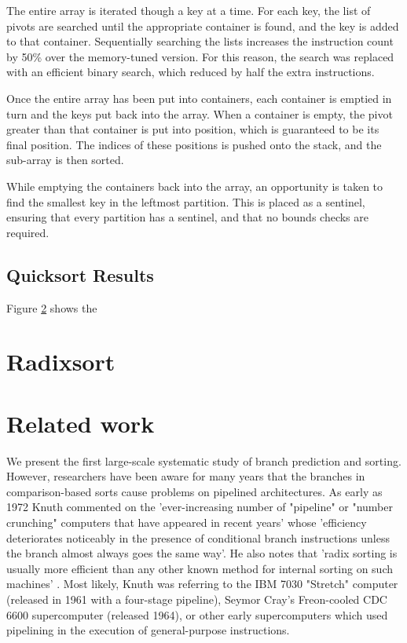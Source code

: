 \documentclass[acmtocl]{acmtrans2m}
\begin{document}
The entire array is iterated though a key at a time. For each key, the
list of pivots are searched until the appropriate container is found,
and the key is added to that container. Sequentially searching the
lists increases the instruction count by 50\% over the memory-tuned
version. For this reason, the search was replaced with an efficient
binary search, which reduced by half the extra instructions.

Once the entire array has been put into containers, each container is
emptied in turn and the keys put back into the array. When a container
is empty, the pivot greater than that container is put into position,
which is guaranteed to be its final position. The indices of these
positions is pushed onto the stack, and the sub-array is then sorted.

While emptying the containers back into the array, an opportunity is
taken to find the smallest key in the leftmost partition. This is
placed as a sentinel, ensuring that every partition has a sentinel,
and that no bounds checks are required.

\subsection{Quicksort Results}
Figure \ref{} shows the 




\section{Radixsort}



\section{Related work} 


We present the first large-scale systematic study of branch prediction
and sorting. However, researchers have been aware for many years that
the branches in comparison-based sorts cause problems on pipelined
architectures. As early as 1972 Knuth commented on the
'ever-increasing number of "pipeline" or "number crunching" computers
that have appeared in recent years' whose 'efficiency deteriorates
noticeably in the presence of conditional branch instructions unless
the branch almost always goes the same way'. He also notes that 'radix
sorting is usually more efficient than any other known method for
internal sorting on such machines' \cite{Knuth72c}. Most likely, Knuth
was referring to the IBM 7030 "Stretch" computer (released in 1961
with a four-stage pipeline), Seymor Cray's Freon-cooled CDC 6600
supercomputer (released 1964), or other early supercomputers which
used pipelining in the execution of general-purpose instructions.
\end{document}
